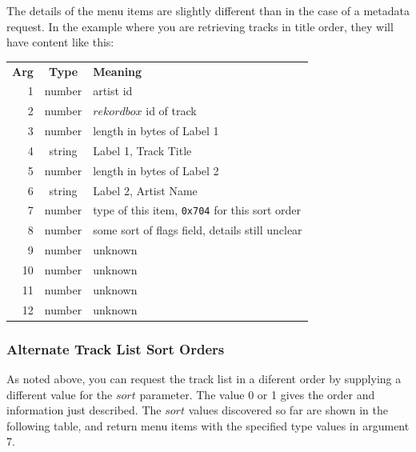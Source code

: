 \documentclass[11pt]{article}
\begin{document}
The details of the menu items are slightly different than in the case
of a metadata request. In the example where you are retrieving tracks
in title order, they will have content like this:

\begin{center}
  \begin{tabu}{rcX}
    \toprule

    \bfseries{Arg} & \bfseries{Type} & \bfseries{Meaning} \\

    1 & number & artist id \\

    2 & number & $rekordbox$ id of track \\

    3 & number & length in bytes of Label 1 \\

    4 & string & Label 1, Track Title \\

    5 & number & length in bytes of Label 2 \\

    6 & string & Label 2, Artist Name \\

    7 & number & type of this item, {\tt 0x704} for this sort order \\

    8 & number & some sort of flags field, details still unclear \\

    9 & number & unknown \\

    10 & number & unknown \\

    11 & number & unknown \\

    12 & number & unknown \\

    \bottomrule
  \end{tabu}
\end{center}

\subsubsection{Alternate Track List Sort Orders}
\label{sec:trackListSorting}

As noted above, you can request the track list in a diferent order by
supplying a different value for the $sort$ parameter. The value 0 or 1
gives the order and information just described. The $sort$ values
discovered so far are shown in the following table, and return menu
items with the specified type values in argument 7.
\end{document}
